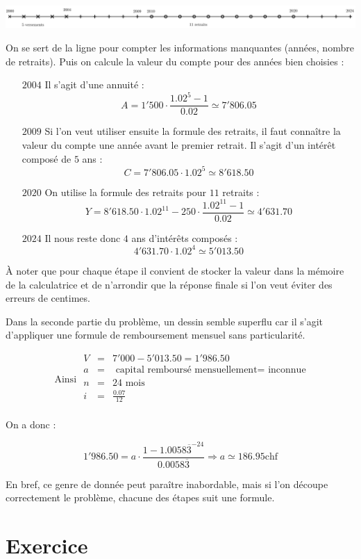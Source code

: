 \begin{center}
\includegraphics[width = \textwidth]{mathfin/ligneexemple.png}
\end{center}

On se sert de la ligne pour compter les informations manquantes (années, nombre de retraits). Puis on calcule la valeur du compte pour des années bien choisies :
\begin{enumerate}
\item[$2004$] Il s'agit d'une annuité :
$$
A = 1'500 \cdot \frac{1.02^5-1}{0.02} \simeq 7'806.05
$$
\item[$2009$] Si l'on veut utiliser ensuite la formule des retraits, il faut connaître la valeur du compte une année avant le premier retrait. Il s'agit d'un intérêt composé de $5$ ans :
$$
C = 7'806.05 \cdot 1.02^5 \simeq 8'618.50
$$
\item[$2020$] On utilise la formule des retraits pour $11$ retraits :
$$
Y = 8'618.50 \cdot 1.02^{11} - 250 \cdot \frac{1.02^11 - 1}{0.02} \simeq 4'631.70
$$
\item[$2024$] Il nous reste donc $4$ ans d'intérêts composés :
$$
4'631.70 \cdot 1.02^4 \simeq 5'013.50
$$
\end{enumerate}
À noter que pour chaque étape il convient de stocker la valeur dans la mémoire de la calculatrice et de n'arrondir que la réponse finale si l'on veut éviter des erreurs de centimes.

Dans la seconde partie du problème, un dessin semble superflu car il s'agit d'appliquer une formule de remboursement mensuel sans particularité. 

\begin{equation*}
\mbox{ Ainsi } 
\begin{array}{lll}
V&=&7'000-5'013.50 = 1'986.50\\
a&=&\mbox{ capital remboursé mensuellement} = \mbox{ inconnue}\\
n&=&24 \mbox{ mois}\\
i&=& \frac{0.07}{12}\\
\end{array}
\end{equation*}

On a donc :

$$
1'986.50 = a \cdot \frac{1-1.0058\overline{3}^{-24}}{0.0058\overline{3}} \Longrightarrow a \simeq 186.95\mbox{chf}
$$

En bref, ce genre de donnée peut paraître inabordable, mais si l'on découpe correctement le problème, chacune des étapes suit une formule.
\section{Exercice}




